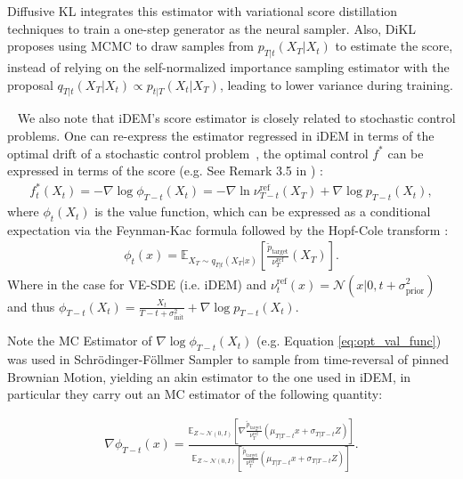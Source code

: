 \documentclass{article} %
\def\ptilde{\tilde{p}_\text{target}}
\begin{document}
\begin{enumerate}[label=({{\arabic*}}), leftmargin=*]
Diffusive KL \citep[DiKL, ][]{he2024training} integrates this estimator with variational score distillation techniques \citep{poole2022dreamfusion, luo2024diff} to train a one-step generator as the neural sampler.
Also, DiKL proposes using MCMC to draw samples from $p_{T|t}(X_T|X_t)$ to estimate the score,  instead of relying on the self-normalized importance sampling estimator with the proposal $q_{T|t}(X_T | X_t)\propto p_{t|T}(X_t|X_T)$, leading to lower variance during training.
\par
~ We also note that iDEM's score estimator is closely related to stochastic control problems.
   One can re-express the estimator regressed in iDEM in terms of the optimal drift of a stochastic control problem~\citep{huang2021schr}, the optimal control $f^*$ can be expressed in terms of the score (e.g. See Remark 3.5 in \cite{reusmooth}) :
        \begin{align}\label{eq:optimal_drift}
             f^*_{t}(X_t) = - \nabla \log \phi_{T-t}(X_t) = - \nabla \ln \nu_{T-t}^{\mathrm{ref}}(X_T) +\nabla \log {p_{T-t}(X_t)},
        \end{align} where $\phi_t(X_t) $ is the 
     value function, which can be expressed as a conditional expectation via the Feynman-Kac formula followed by the Hopf-Cole transform \citep{hopf1950partial,cole1951quasi,fleming1989logarithmic}:
\begin{align}\label{eq:opt_val_func_appendix}
\phi_t(x) = \mathbb{E}_{X_T \sim q_{T|t}(X_T|x)}\left [\frac{\ptilde}{\nu^{\mathrm{ref}}_T}(X_T)\right]. 
\end{align}
Where in the case for VE-SDE (i.e. iDEM) and 
$\nu^{\mathrm{ref}}_t(x) = \mathcal{N}(x| 0, t+ \sigma_{\mathrm{prior}}^2)$ and thus $\phi_{T-t}(X_t) = \frac{X_t}{T-t +\sigma_{\mathrm{init}}^2} +\nabla \log {p_{T-t}(X_t)}$.

Note the MC Estimator of $\nabla \log \phi_{T-t}(X_t)$ (e.g. Equation \ref{eq:opt_val_func}) was used in Schr\"odinger-F\"ollmer Sampler \citep[SFS, ][]{huang2021schr} to sample from time-reversal of pinned Brownian Motion, yielding an akin estimator to the one used in iDEM, in particular they carry out an MC estimator of the following quantity:

\begin{align}
   \nabla \phi_{T-t}(x) = \frac{\mathbb{E}_{Z \sim \mathcal{N}(0,I)}\left [\nabla\frac{\ptilde}{\nu^{\mathrm{ref}}_T}( \mu_{T|T-t}x + \sigma_{T|T-t}Z)\right]}{\mathbb{E}_{Z \sim \mathcal{N}(0,I)}\left [\frac{\ptilde}{\nu^{\mathrm{ref}}_T}( \mu_{T|T-t}x + \sigma_{T|T-t}Z)\right]}.
\end{align}


\end{enumerate}
\end{document}
